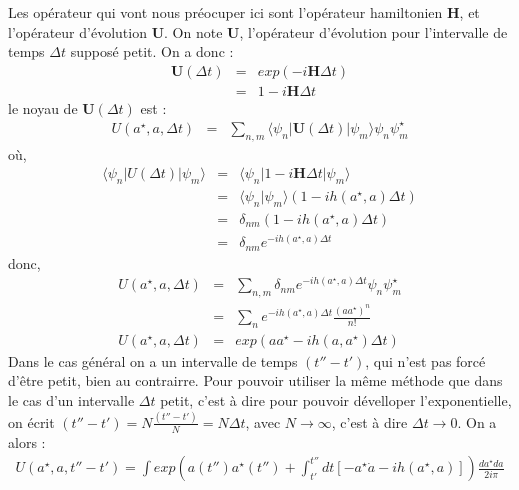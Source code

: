 \documentclass[a4paper,11pt]{article} %
\theoremstyle{plain}
\theoremstyle{definition}
\theoremstyle{remark}
\numberwithin{equation}{section}
\numberwithin{equation}{subsection}
\numberwithin{figure}{section}
\begin{document}
\noindent
Les opérateur qui vont nous préocuper ici sont l'opérateur hamiltonien $\textbf{H}$, et l'opérateur d'évolution $\textbf{U}$. On note $\textbf{U}$, l'opérateur d'évolution pour l'intervalle de temps $\Delta t$ supposé petit. On a donc :
\begin{eqnarray*}
 \textbf{U}(\Delta t) &=& exp( -i \textbf{H} \Delta t )\\
             &=& 1 - i \textbf{H} \Delta t
\end{eqnarray*}
le noyau de $\textbf{U}(\Delta t)$ est :
\begin{eqnarray*}
 U(a^{\star} , a, \Delta t) &=& \sum_{n,m} \langle \psi_{n} | \textbf{U}(\Delta t) | \psi_{m} \rangle  \psi_{n} \psi_{m}^{\star}
\end{eqnarray*}
où,
\begin{eqnarray*}
 \langle \psi_{n} | U(\Delta t) | \psi_{m} \rangle &=& \langle \psi_{n} | 1 - i \textbf{H} \Delta t | \psi_{m} \rangle \\
                                                   &=& \langle \psi_{n} | \psi_{m} \rangle \left( 1 - i h(a^{\star},a) \Delta t \right) \\
                                                   &=& \delta_{nm} \left( 1 - i h(a^{\star},a) \Delta t \right) \\
                                                   &=&  \delta_{nm} e^{-i h (a^{\star},a) \Delta t}
\end{eqnarray*}
donc, 
\begin{eqnarray*}
 U(a^{\star} , a, \Delta t) &=& \sum_{n, m} \delta_{nm} e^{-i h (a^{\star},a) \Delta t} \psi_{n} \psi_{m}^{\star} \\
                            &=& \sum_{n} e^{-i h (a^{\star},a) \Delta t} \frac{\left(a a^{\star}\right)^{n}}{n !}\\
 U(a^{\star} , a, \Delta t) &=& exp\left(a a^{\star} - i h(a , a^{\star}) \Delta t \right) 
\end{eqnarray*}
Dans le cas général on a un intervalle de temps $(t''-t')$, qui n'est pas forcé d'être petit, bien au contrairre. Pour pouvoir utiliser la même méthode que dans le cas d'un  intervalle $\Delta t$ petit, c'est à dire pour pouvoir dévelloper l'exponentielle, on écrit $ (t''-t') = N \frac{(t''-t')}{N} = N \Delta t$, avec $N \rightarrow \infty$, c'est à dire $\Delta t \rightarrow 0$. On a alors :
\begin{eqnarray*}
  U(a^{\star} , a, t''-t') = \int exp \left( a(t'') a^{\star}(t'') 
+ \int_{t'}^{t''} dt \left[ -a^{\star} \dot{a} - i h(a^{\star},a) \right] \right) \frac{da^{\star} da}{2i \pi}
\end{eqnarray*}
\end{document}
